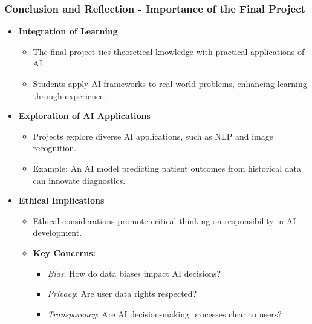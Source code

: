 \documentclass[aspectratio=169]{beamer}
\begin{document}
\begin{frame}[fragile]
  \frametitle{Conclusion and Reflection - Importance of the Final Project}
  \begin{itemize}
    \item \textbf{Integration of Learning}
      \begin{itemize}
        \item The final project ties theoretical knowledge with practical applications of AI.
        \item Students apply AI frameworks to real-world problems, enhancing learning through experience.
      \end{itemize}
      
    \item \textbf{Exploration of AI Applications}
      \begin{itemize}
        \item Projects explore diverse AI applications, such as NLP and image recognition.
        \item Example: An AI model predicting patient outcomes from historical data can innovate diagnostics.
      \end{itemize}
      
    \item \textbf{Ethical Implications}
      \begin{itemize}
        \item Ethical considerations promote critical thinking on responsibility in AI development.
        \item \textbf{Key Concerns:}
          \begin{itemize}
            \item \textit{Bias}: How do data biases impact AI decisions?
            \item \textit{Privacy}: Are user data rights respected?
            \item \textit{Transparency}: Are AI decision-making processes clear to users?
          \end{itemize}
      \end{itemize}
  \end{itemize}
\end{frame}
\end{document}
